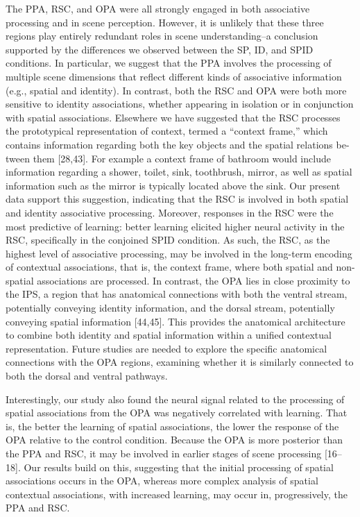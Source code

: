 \documentclass[english]{article}
\begin{document}
The PPA, RSC, and OPA were all strongly engaged in both associative processing
and in scene perception\citep{aminoff2015associative}.
%
However, it is unlikely that these three regions play entirely redundant roles
in scene understanding–a conclusion supported by the differences we observed
between the SP, ID, and SPID conditions\citep{aminoff2015associative}.
%
In particular, we suggest that the PPA involves the processing of multiple scene
dimensions that reflect different kinds of associative information (e.g.,
spatial and identity)\citep{aminoff2015associative}.
%
In contrast, both the RSC and OPA were both more sensitive to identity
associations, whether appearing in isolation or in conjunction with spatial
associations. Elsewhere we have suggested that the RSC processes the
prototypical representation of context, termed a “context frame,” which contains
information regarding both the key objects and the spatial relations be- tween
them [28,43]\citep{aminoff2015associative}.
%
For example a context frame of bathroom would include information regarding a
shower, toilet, sink, toothbrush, mirror, as well as spatial information such as
the mirror is typically located above the sink\citep{aminoff2015associative}.
%
Our present data support this suggestion, indicating that the RSC is involved in
both spatial and identity associative processing. Moreover, responses in the RSC
were the most predictive of learning: better learning elicited higher neural
activity in the RSC, specifically in the conjoined SPID
condition\citep{aminoff2015associative}.
%
As such, the RSC, as the highest level of associative processing, may be
involved in the long-term encoding of contextual associations, that is, the
context frame, where both spatial and non-spatial associations are
processed\citep{aminoff2015associative}.
%
In contrast, the OPA lies in close proximity to the IPS, a region that has
anatomical connections with both the ventral stream, potentially conveying
identity information, and the dorsal stream, potentially conveying spatial
information [44,45]\citep{aminoff2015associative}.
%
This provides the anatomical architecture to combine both identity and spatial
information within a unified contextual
representation\citep{aminoff2015associative}.
%
Future studies are needed to explore the specific anatomical connections with
the OPA regions, examining whether it is similarly connected to both the dorsal
and ventral pathways\citep{aminoff2015associative}.

%
Interestingly, our study also found the neural signal related to the processing
of spatial associations from the OPA was negatively correlated with
learning\citep{aminoff2015associative}.
%
That is, the better the learning of spatial associations, the lower the response
of the OPA relative to the control condition. Because the OPA is more posterior
than the PPA and RSC, it may be involved in earlier stages of scene processing
[16–18]\citep{aminoff2015associative}.
%
Our results build on this, suggesting that the initial processing of spatial
associations occurs in the OPA, whereas more complex analysis of spatial
contextual associations, with increased learning, may occur in, progressively,
the PPA and RSC\citep{aminoff2015associative}.
\end{document}
